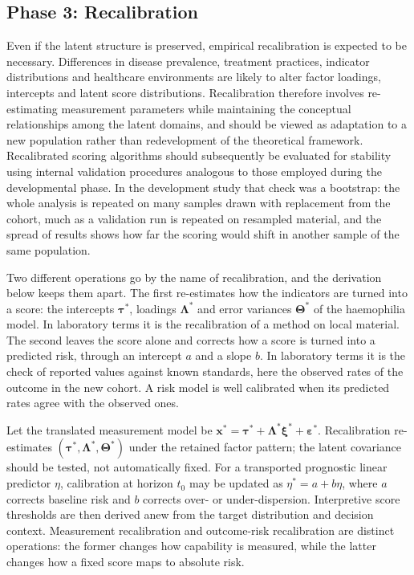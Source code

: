 \subsection{Phase 3: Recalibration}

Even if the latent structure is preserved, empirical recalibration is expected to be necessary. Differences in disease prevalence, treatment practices, indicator distributions and healthcare environments are likely to alter factor loadings, intercepts and latent score distributions. Recalibration therefore involves re-estimating measurement parameters while maintaining the conceptual relationships among the latent domains, and should be viewed as adaptation to a new population rather than redevelopment of the theoretical framework. Recalibrated scoring algorithms should subsequently be evaluated for stability using internal validation procedures analogous to those employed during the developmental phase. In the development study that check was a bootstrap: the whole analysis is repeated on many samples drawn with replacement from the cohort, much as a validation run is repeated on resampled material, and the spread of results shows how far the scoring would shift in another sample of the same population.

Two different operations go by the name of recalibration, and the derivation below keeps them apart. The first re-estimates how the indicators are turned into a score: the intercepts $\boldsymbol\tau^*$, loadings $\boldsymbol\Lambda^*$ and error variances $\boldsymbol\Theta^*$ of the haemophilia model. In laboratory terms it is the recalibration of a method on local material. The second leaves the score alone and corrects how a score is turned into a predicted risk, through an intercept $a$ and a slope $b$. In laboratory terms it is the check of reported values against known standards, here the observed rates of the outcome in the new cohort. A risk model is well calibrated when its predicted rates agree with the observed ones.

\begin{derivation}
\label{der:recalibration}
Let the translated measurement model be
$\mathbf x^*=\boldsymbol\tau^*+\boldsymbol\Lambda^*\boldsymbol\xi^*+
\boldsymbol\varepsilon^*$. Recalibration re-estimates
$(\boldsymbol\tau^*,\boldsymbol\Lambda^*,\boldsymbol\Theta^*)$ under the retained
factor pattern; the latent covariance should be tested, not automatically fixed.
For a transported prognostic linear predictor $\eta$, calibration at horizon
$t_0$ may be updated as $\eta^*=a+b\eta$, where $a$ corrects baseline risk and
$b$ corrects over- or under-dispersion. Interpretive score thresholds are then
derived anew from the target distribution and decision context. Measurement
recalibration and outcome-risk recalibration are distinct operations: the former
changes how capability is measured, while the latter changes how a fixed score
maps to absolute risk.
\end{derivation}

